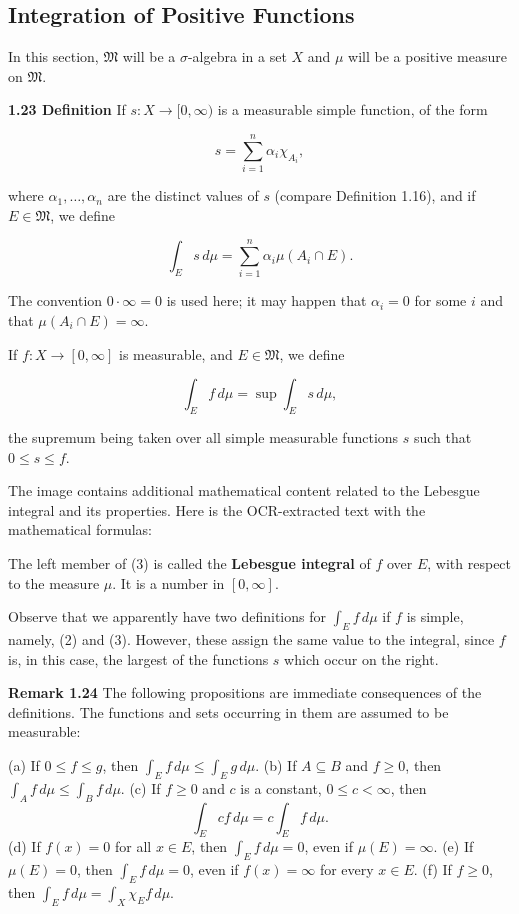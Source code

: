 \documentclass[11pt]{article}
\begin{document}
\subsection{Integration of Positive Functions}
\label{sec:org34ac2e4}

In this section, \(\mathfrak{M}\) will be a \(\sigma\)-algebra in a set \(X\) and \(\mu\) will be a positive measure on \(\mathfrak{M}\).

\label{org0bfd2dd}
\textbf{\textbf{1.23 Definition}} If \(s: X \rightarrow [0, \infty)\) is a measurable simple function, of the form

\[
s = \sum_{i=1}^{n} \alpha_{i} \chi_{A_{i}},
\]

where \(\alpha_{1}, \ldots, \alpha_{n}\) are the distinct values of \(s\) (compare Definition 1.16), and if \(E \in \mathfrak{M}\), we define

\[
\int_{E} s \, d\mu = \sum_{i=1}^{n} \alpha_{i} \mu(A_{i} \cap E).
\]

The convention \(0 \cdot \infty = 0\) is used here; it may happen that \(\alpha_{i} = 0\) for some \(i\) and that \(\mu(A_{i} \cap E) = \infty\).

If \(f: X \rightarrow [0, \infty]\) is measurable, and \(E \in \mathfrak{M}\), we define

\[
\int_{E} f \, d\mu = \sup \int_{E} s \, d\mu,
\]

the supremum being taken over all simple measurable functions \(s\) such that \(0 \leq s \leq f\).

The image contains additional mathematical content related to the Lebesgue integral and its properties. Here is the OCR-extracted text with the mathematical formulas:

The left member of (3) is called the \textbf{\textbf{Lebesgue integral}} of \(f\) over \(E\), with respect to the measure \(\mu\). It is a number in \([0, \infty]\).

Observe that we apparently have two definitions for \(\int_{E} f \, d\mu\) if \(f\) is simple, namely, (2) and (3). However, these assign the same value to the integral, since \(f\) is, in this case, the largest of the functions \(s\) which occur on the right.

\label{org1a5926c}
\textbf{\textbf{Remark 1.24}} The following propositions are immediate consequences of the definitions. The functions and sets occurring in them are assumed to be measurable:

(a) If \(0 \leq f \leq g\), then \(\int_{E} f \, d\mu \leq \int_{E} g \, d\mu\).
(b) If \(A \subseteq B\) and \(f \geq 0\), then \(\int_{A} f \, d\mu \leq \int_{B} f \, d\mu\).
(c) If \(f \geq 0\) and \(c\) is a constant, \(0 \leq c < \infty\), then
\[
\int_{E} cf \, d\mu = c \int_{E} f \, d\mu.
\]
(d) If \(f(x) = 0\) for all \(x \in E\), then \(\int_{E} f \, d\mu = 0\), even if \(\mu(E) = \infty\).
(e) If \(\mu(E) = 0\), then \(\int_{E} f \, d\mu = 0\), even if \(f(x) = \infty\) for every \(x \in E\).
(f) If \(f \geq 0\), then \(\int_{E} f \, d\mu = \int_{X} \chi_{E} f \, d\mu\).
\end{document}
